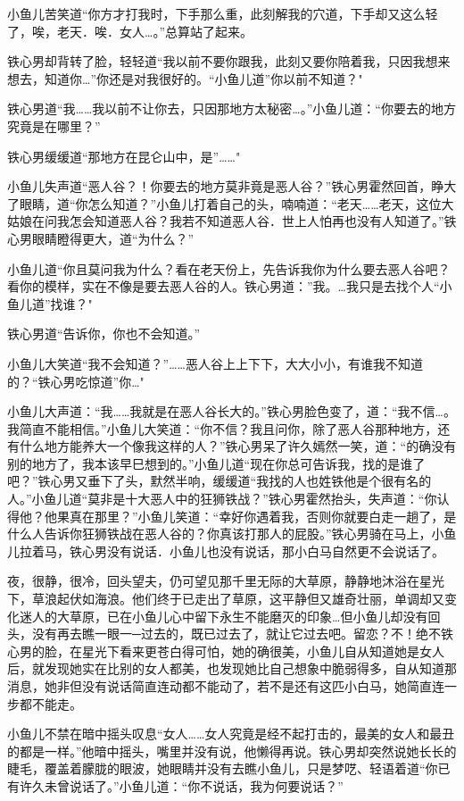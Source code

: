 \documentclass[12pt,oneside]{book}
\begin{document}
小鱼儿苦笑道``你方才打我时，下手那么重，此刻解我的穴道，下手却又这么轻了，唉，老天．唉．女人\ldots。''总算站了起来。

铁心男却背转了脸，轻轻道``我以前不要你跟我，此刻又要你陪着我，只因我想来想去，知道你\ldots{}''你还是对我很好的。``小鱼儿道''你以前不知道？"

铁心男道``我\ldots\ldots 我以前不让你去，只因那地方太秘密\ldots。''小鱼儿道：``你要去的地方究竟是在哪里？''

铁心男缓缓道``那地方在昆仑山中，是''\ldots\ldots"

小鱼儿失声道``恶人谷？！你要去的地方莫非竟是恶人谷？''铁心男霍然回首，睁大了眼睛，道``你怎么知道？''小鱼儿打着自己的头，喃喃道：``老天\ldots\ldots 老天，这位大姑娘在问我怎会知道恶人谷？我若不知道恶人谷．世上人怕再也没有人知道了。''铁心男眼睛瞪得更大，道``为什么？''

小鱼儿道``你且莫问我为什么？看在老天份上，先告诉我你为什么要去恶人谷吧？看你的模样，实在不像是要去恶人谷的人。铁心男道：''我。\ldots 我只是去找个人``小鱼儿道''找谁？"

铁心男道``告诉你，你也不会知道。''

小鱼儿大笑道``我不会知道？''\ldots\ldots 恶人谷上上下下，大大小小，有谁我不知道的？``铁心男吃惊道''你\ldots"

小鱼儿大声道：``我\ldots\ldots 我就是在恶人谷长大的。''铁心男脸色变了，道：``我不信\ldots。我简直不能相信。''小鱼儿大笑道：``你不信？我且问你，除了恶人谷那种地方，还有什么地方能养大一个像我这样的人？''铁心男呆了许久嫣然一笑，道：``的确没有别的地方了，我本该早巳想到的。''小鱼儿道``现在你总可告诉我，找的是谁了吧？''铁心男又垂下了头，默然半响，缓缓道``我找的人也姓铁他是个很有名的人。''小鱼儿道``莫非是十大恶人中的狂狮铁战？''铁心男霍然抬头，失声道：``你认得他？他果真在那里？''小鱼儿笑道：``幸好你遇着我，否则你就要白走一趟了，是什么人告诉你狂狮铁战在恶人谷的？你真该打那人的屁股。''铁心男骑在马上，小鱼儿拉着马，铁心男没有说话．小鱼儿也没有说话，那小白马自然更不会说话了。

夜，很静，很冷，回头望夫，仍可望见那千里无际的大草原，静静地沐浴在星光下，草浪起伏如海浪。他们终于已走出了草原，这平静但又雄奇壮丽，单调却又变化迷人的大草原，已在小鱼儿心中留下永生不能磨灭的印象\ldots 但小鱼儿却没有回头，没有再去瞧一眼一─过去的，既已过去了，就让它过去吧。留恋？不！绝不铁心男的脸，在星光下看来更苍白得可怕，她的确很美，小鱼儿自从知道她是女人后，就发现她实在比别的女人都美，也发现她比自己想象中脆弱得多，自从知道那消息，她非但没有说话简直连动都不能动了，若不是还有这匹小白马，她简直连一步都不能走。

小鱼儿不禁在暗中摇头叹息``女人\ldots\ldots 女人究竟是经不起打击的，最美的女人和最丑的都是一样。''他暗中摇头，嘴里并没有说，他懒得再说。铁心男却突然说她长长的睫毛，覆盖着朦胧的眼波，她眼睛并没有去瞧小鱼儿，只是梦呓、轻语着道``你已有许久未曾说话了。''小鱼儿道：``你不说话，我为何要说话？''
\end{document}
